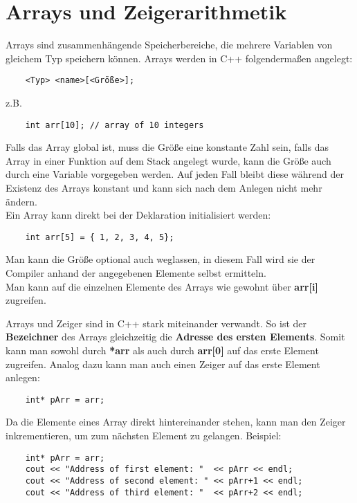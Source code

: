 \documentclass[
  accentcolor=tud1c,	%
  colorbacktitle,		%
  inverttitle,			%
  german,				%
  twoside
]{tudexercise}
\begin{document}
\section{Arrays und Zeigerarithmetik}
Arrays sind zusammenhängende Speicherbereiche, die mehrere Variablen von gleichem Typ speichern können.
Arrays werden in C++ folgendermaßen angelegt:

\begin{lstlisting}
	<Typ> <name>[<Größe>];
\end{lstlisting}

z.B.
\begin{lstlisting}
	int arr[10]; // array of 10 integers
\end{lstlisting}

Falls das Array global ist, muss die Größe eine konstante Zahl sein, falls das Array in einer Funktion auf dem Stack angelegt wurde, kann die Größe auch durch eine Variable vorgegeben werden.
Auf jeden Fall bleibt diese während der Existenz des Arrays konstant und kann sich nach dem Anlegen nicht mehr ändern.\\
Ein Array kann direkt bei der Deklaration initialisiert werden:
\begin{lstlisting}
	int arr[5] = { 1, 2, 3, 4, 5};
\end{lstlisting}
Man kann die Größe optional auch weglassen, in diesem Fall wird sie der Compiler anhand der angegebenen Elemente selbst ermitteln. \\

Man kann auf die einzelnen Elemente des Arrays wie gewohnt über 
\textbf{arr[i]}
zugreifen.

Arrays und Zeiger sind in C++ stark miteinander verwandt.
So ist der \textbf{Bezeichner} des Arrays gleichzeitig die \textbf{Adresse des ersten Elements}.
Somit kann man sowohl durch \textbf{*arr} als auch durch \textbf{arr[0]} auf das erste Element zugreifen.
Analog dazu kann man auch einen Zeiger auf das erste Element anlegen:
\begin{lstlisting}
	int* pArr = arr;
\end{lstlisting}
Da die Elemente eines Array direkt hintereinander stehen, kann man den Zeiger inkrementieren, um zum  nächsten Element zu gelangen.
Beispiel:

\begin{lstlisting}
	int* pArr = arr;
	cout << "Address of first element: "  << pArr << endl;
	cout << "Address of second element: " << pArr+1 << endl;
	cout << "Address of third element: "  << pArr+2 << endl;
\end{lstlisting}
\end{document}
